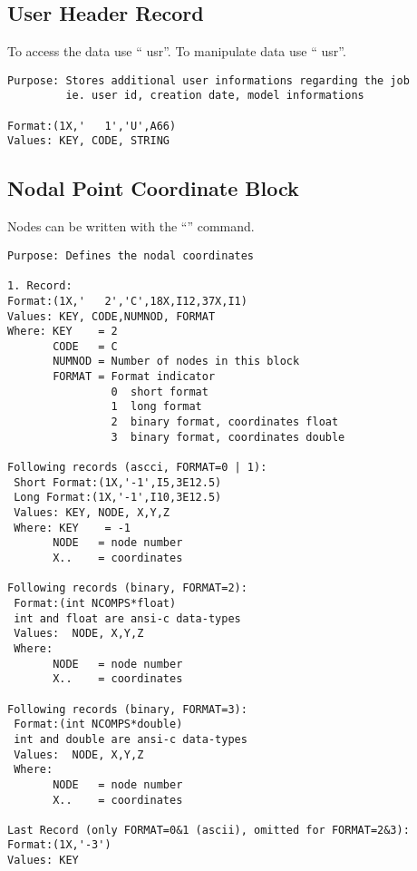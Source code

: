 \documentclass{article}
\begin{document}
\subsection{\label{User Header Record}User Header Record}
To access the data use `` usr''.
To manipulate data use `` usr''.
\begin{verbatim}
Purpose: Stores additional user informations regarding the job
         ie. user id, creation date, model informations

Format:(1X,'   1','U',A66)  
Values: KEY, CODE, STRING
\end{verbatim}

\subsection{\label{Nodal Point Coordinate Block}Nodal Point Coordinate Block}
Nodes can be written with the ``'' command.
\begin{verbatim}
Purpose: Defines the nodal coordinates

1. Record:
Format:(1X,'   2','C',18X,I12,37X,I1)
Values: KEY, CODE,NUMNOD, FORMAT
Where: KEY    = 2
       CODE   = C
       NUMNOD = Number of nodes in this block
       FORMAT = Format indicator
                0  short format
                1  long format 
                2  binary format, coordinates float 
                3  binary format, coordinates double 

Following records (ascci, FORMAT=0 | 1):
 Short Format:(1X,'-1',I5,3E12.5)
 Long Format:(1X,'-1',I10,3E12.5)
 Values: KEY, NODE, X,Y,Z
 Where: KEY    = -1
       NODE   = node number
       X..    = coordinates

Following records (binary, FORMAT=2):
 Format:(int NCOMPS*float)
 int and float are ansi-c data-types
 Values:  NODE, X,Y,Z
 Where: 
       NODE   = node number
       X..    = coordinates

Following records (binary, FORMAT=3):
 Format:(int NCOMPS*double)
 int and double are ansi-c data-types
 Values:  NODE, X,Y,Z
 Where: 
       NODE   = node number
       X..    = coordinates
  
Last Record (only FORMAT=0&1 (ascii), omitted for FORMAT=2&3):
Format:(1X,'-3')
Values: KEY
\end{verbatim}
\end{document}
